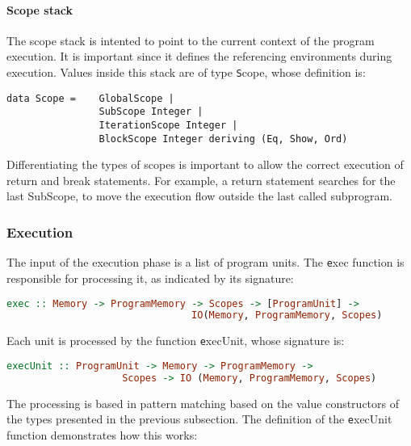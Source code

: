 \paragraph{Scope stack}

The scope stack is intented to point to the current
context of the program execution. It is important
since it defines the referencing environments during
execution. Values inside this stack are of type 
{\texttt Scope}, whose definition is:

\begin{lstlisting}[language=Gryph, basicstyle=\footnotesize]
data Scope =    GlobalScope | 
                SubScope Integer | 
                IterationScope Integer | 
                BlockScope Integer deriving (Eq, Show, Ord)
\end{lstlisting}

Differentiating the types of scopes is important to allow the correct execution of 
return and break statements. For example, a return statement searches for the
last SubScope, to move the execution flow outside the last called subprogram.

\subsubsection{Execution}

The input of the execution phase is a list of program units. The {\texttt exec}
function is responsible for processing it, as indicated by its
signature:

\begin{lstlisting}[language=Haskell, basicstyle=\footnotesize]
exec :: Memory -> ProgramMemory -> Scopes -> [ProgramUnit] -> 
                                IO(Memory, ProgramMemory, Scopes) 
\end{lstlisting}

Each unit is processed by the function {\texttt execUnit}, whose signature is:

\begin{lstlisting}[language=Haskell, basicstyle=\footnotesize]
execUnit :: ProgramUnit -> Memory -> ProgramMemory -> 
                    Scopes -> IO (Memory, ProgramMemory, Scopes)
\end{lstlisting}

The processing is based in pattern matching based on the value constructors
of the types presented in the previous subsection. The definition of the
{\texttt execUnit} function demonstrates how this works:

